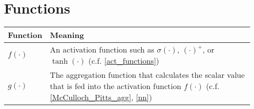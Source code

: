 \section{Functions}

\begin{tabular}{ p{3cm} p{11cm} }
	\textbf{Function} & \textbf{Meaning}\\
	\hline
	$f(\cdot)$ & An activation function such as $\sigma(\cdot)$, $(\cdot)^{+}$, or $\tanh(\cdot)$ (c.f. \eqref{act_functions})\\
	$g(\cdot)$ & The aggregation function that calculates the scalar value that is fed into the activation function $f(\cdot)$ (c.f. \eqref{McCulloch_Pitts_agg},  \eqref{nn})\\
\end{tabular}







